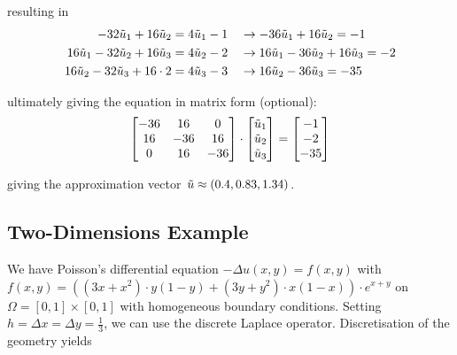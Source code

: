 resulting in
\begin{align*}
	-32\tilde{u}_1 + 16\tilde{u}_2 & = 4\tilde{u}_1 - 1\quad\rightarrow -36\tilde{u}_1 + 16\tilde{u}_2 = -1 \\
	16\tilde{u}_1 - 32\tilde{u}_2 + 16\tilde{u}_3 & = 4\tilde{u}_2 - 2\quad\rightarrow 16\tilde{u}_1 - 36\tilde{u}_2 + 16\tilde{u}_3 = -2 \\
	16\tilde{u}_2 - 32\tilde{u}_3 + 16\cdot 2 & = 4\tilde{u}_3 - 3\quad\rightarrow 16\tilde{u}_2 - 36\tilde{u}_3 = -35
\end{align*}

ultimately giving the equation in matrix form (optional):
\begin{align*}
	\begin{bmatrix}
		-36 & 16 & 0 \\
		16 & -36 & 16 \\
		0 & 16 & -36
	\end{bmatrix}
	\cdot
	\begin{bmatrix}
		\tilde{u}_1 \\
		\tilde{u}_2 \\
		\tilde{u}_3 \\
	\end{bmatrix}
	=
	\begin{bmatrix}
		-1 \\
		-2 \\
		-35
	\end{bmatrix}
\end{align*}

giving the approximation vector $\tilde{u} \approx (0.4, 0.83, 1.34)$.

\subsection{Two-Dimensions Example}

We have Poisson's differential equation $-\Delta u(x,y)=f(x,y)$ with
$f(x,y) = \left( (3x+x^2)\cdot y(1-y) + (3y+y^2)\cdot x(1-x) \right)\cdot e^{x+y}$ on
$\Omega = [0,1]\times [0,1]$ with homogeneous boundary conditions.
Setting $h=\Delta x = \Delta y = \frac{1}{3}$, we can use the discrete Laplace operator.
Discretisation of the geometry yields

